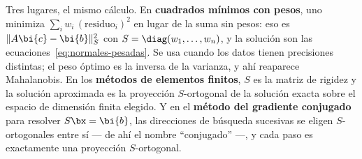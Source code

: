 \begin{remark}
Tres lugares, el mismo cálculo. En \textbf{cuadrados mínimos con pesos}, uno
minimiza $\sum_i w_i\,(\text{residuo}_i)^2$ en lugar de la suma sin pesos:
eso es $\|A\bi{c}-\bi{b}\|_S^2$ con $S=\diag(w_1,\dots,w_n)$, y la solución
son las ecuaciones~\eqref{eq:normales-pesadas}. Se usa cuando los datos
tienen precisiones distintas; el peso óptimo es la inversa de la varianza, y
ahí reaparece Mahalanobis. En los \textbf{métodos de elementos finitos}, $S$
es la matriz de rigidez y la solución aproximada es la proyección
$S$-ortogonal de la solución exacta sobre el espacio de dimensión finita
elegido. Y en el \textbf{método del gradiente conjugado} para resolver
$S\bx=\bi{b}$, las direcciones de búsqueda sucesivas se eligen
$S$-ortogonales entre sí --- de ahí el nombre ``conjugado'' ---, y cada paso
es exactamente una proyección $S$-ortogonal.
\end{remark}


